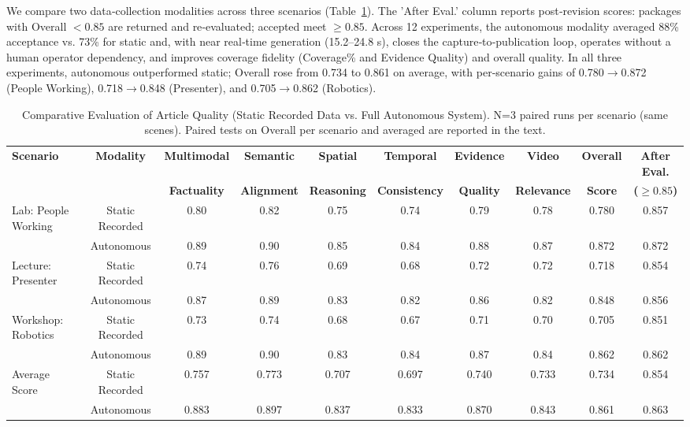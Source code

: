 \documentclass[letterpaper, 10 pt, conference]{ieeeconf}  %
\begin{document}
We compare two data‑collection modalities across three scenarios (Table~\ref{tab:article_quality}). The 'After Eval.' column reports post‑revision scores: packages with Overall \(<0.85\) are returned and re‑evaluated; accepted meet \(\ge 0.85\). Across 12 experiments, the autonomous modality averaged 88\% acceptance vs. 73\% for static and, with near real‑time generation (15.2–24.8 s), closes the capture‑to‑publication loop, operates without a human operator dependency, and improves coverage fidelity (Coverage\% and Evidence Quality) and overall quality. In all three experiments, autonomous outperformed static; Overall rose from 0.734 to 0.861 on average, with per‑scenario gains of 0.780$\to$0.872 (People Working), 0.718$\to$0.848 (Presenter), and 0.705$\to$0.862 (Robotics).

\begin{table}[!t]
\centering
\caption{Comparative Evaluation of Article Quality (Static Recorded Data vs. Full Autonomous System). N=3 paired runs per scenario (same scenes). Paired tests on Overall per scenario and averaged are reported in the text.}
\label{tab:article_quality}
\footnotesize
\setlength{\tabcolsep}{4pt}
\begin{tabular}{|l|c|c|c|c|c|c|c|c|c|}
\hline
\textbf{Scenario} & \textbf{Modality} & \textbf{Multimodal} & \textbf{Semantic} & \textbf{Spatial} & \textbf{Temporal} & \textbf{Evidence} & \textbf{Video} & \textbf{Overall} & \textbf{After Eval.} \\
 &  & \textbf{Factuality} & \textbf{Alignment} & \textbf{Reasoning} & \textbf{Consistency} & \textbf{Quality} & \textbf{Relevance} & \textbf{Score} & \textbf{(\(\ge 0.85\))} \\
\hline
Lab: People Working & Static Recorded & 0.80 & 0.82 & 0.75 & 0.74 & 0.79 & 0.78 & 0.780 & 0.857 \\
\hline
 & Autonomous & 0.89 & 0.90 & 0.85 & 0.84 & 0.88 & 0.87 & 0.872 & 0.872 \\
\hline
Lecture: Presenter & Static Recorded & 0.74 & 0.76 & 0.69 & 0.68 & 0.72 & 0.72 & 0.718 & 0.854 \\
\hline
 & Autonomous & 0.87 & 0.89 & 0.83 & 0.82 & 0.86 & 0.82 & 0.848 & 0.856 \\
\hline
Workshop: Robotics & Static Recorded & 0.73 & 0.74 & 0.68 & 0.67 & 0.71 & 0.70 & 0.705 & 0.851 \\
\hline
 & Autonomous & 0.89 & 0.90 & 0.83 & 0.84 & 0.87 & 0.84 & 0.862 & 0.862 \\
\hline
Average Score & Static Recorded & 0.757 & 0.773 & 0.707 & 0.697 & 0.740 & 0.733 & 0.734 & 0.854 \\
\hline
 & Autonomous & 0.883 & 0.897 & 0.837 & 0.833 & 0.870 & 0.843 & 0.861 & 0.863 \\
\hline
\end{tabular}
\end{table}
\end{document}
